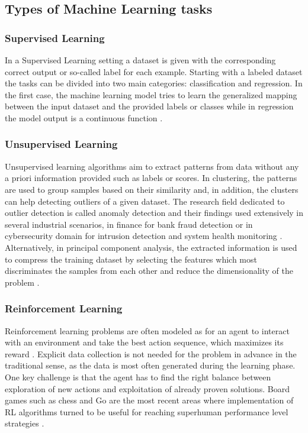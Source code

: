 \subsection{Types of Machine Learning tasks}


\subsubsection{Supervised Learning}

In a Supervised Learning setting a dataset is given with the corresponding correct output or so-called label for each example. Starting with a labeled dataset the tasks can be divided into two main categories: classification and regression. In the first case, the machine learning model tries to learn the generalized mapping between the input dataset and the provided labels or classes while in regression the model output is a continuous function \cite{DL_book_Goodfellow}.

\subsubsection{Unsupervised Learning}

Unsupervised learning algorithms aim to extract patterns from data without any a priori information provided such as labels or scores. In clustering, the patterns are used to group samples based on their similarity and, in addition, the clusters can help detecting outliers of a given dataset. The research field dedicated to outlier detection is called anomaly detection and their findings used extensively in several industrial scenarios, in finance for bank fraud detection or in cybersecurity domain for intrusion detection and system health monitoring \cite{DL_book_Goodfellow}. Alternatively, in principal component analysis, the extracted information is used to compress the training dataset by selecting the features which most discriminates the samples from each other and reduce the dimensionality of the problem \cite{DL_book_Goodfellow}.


\subsubsection{Reinforcement Learning}

Reinforcement learning problems are often modeled as for an agent to interact with an environment and take the best action sequence, which maximizes its reward \cite{RL_book_Sutton1998}. Explicit data collection is not needed for the problem in advance in the traditional sense, as the data is most often generated during the learning phase. One key challenge is that the agent has to find the right balance between exploration  of new actions and exploitation of already proven solutions. Board games such as chess and Go are the most recent areas where implementation of RL algorithms turned to be useful for reaching superhuman performance level strategies \cite{silver18alphazero}.


